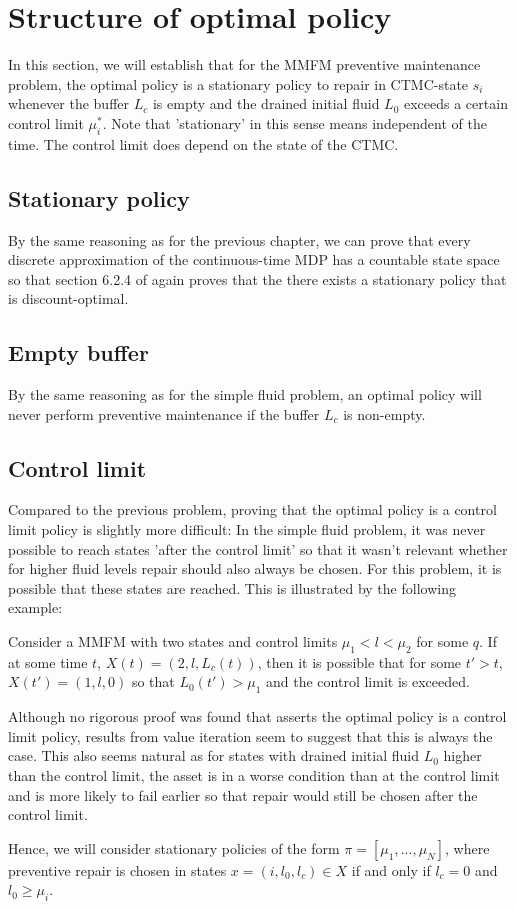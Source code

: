 \section{Structure of optimal policy}
In this section, we will establish that for the MMFM preventive maintenance problem, the optimal policy is a stationary policy to repair in CTMC-state $s_i$ whenever the buffer $L_c$ is empty and the drained initial fluid $L_0$ exceeds a certain control limit $\mu_i^*$.
Note that 'stationary' in this sense means independent of the time. 
The control limit does depend on the state of the CTMC.

\subsection{Stationary policy}
By the same reasoning as for the previous chapter, we can prove that every discrete approximation of the continuous-time MDP has a countable state space so that section 6.2.4 of \cite{Puterman2008} again proves that the there exists a stationary policy that is discount-optimal.

\subsection{Empty buffer}
By the same reasoning as for the simple fluid problem, an optimal policy will never perform preventive maintenance if the buffer $L_c$ is non-empty.

\subsection{Control limit}
Compared to the previous problem, proving that the optimal policy is a control limit policy is slightly more difficult:
In the simple fluid problem, it was never possible to reach states 'after the control limit' so that it wasn't relevant whether for higher fluid levels repair should also always be chosen.
For this problem, it is possible that these states are reached.
This is illustrated by the following example:
\begin{example}
	Consider a MMFM with two states and control limits $\mu_1<l<\mu_2$ for some $q$.
	If at some time $t$, $X(t)=(2,l,L_c(t))$, then it is possible that for some $t'>t$, $X(t')=(1,l,0)$ so that $L_0(t')>\mu_1$ and the control limit is exceeded.
\end{example}
Although no rigorous proof was found that asserts the optimal policy is a control limit policy, results from value iteration seem to suggest that this is always the case.
This also seems natural as for states with drained initial fluid $L_0$ higher than the control limit, the asset is in a worse condition than at the control limit and is more likely to fail earlier so that repair would still be chosen after the control limit.

Hence, we will consider stationary policies of the form $\pi=[\mu_1,...,\mu_N]$, where preventive repair is chosen in states $x=(i,l_0,l_c)\in X$ if and only if $l_c=0$ and $l_0\geq \mu_i$.